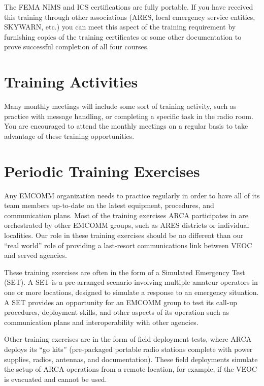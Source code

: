 \documentclass[pdflatex,letterpaper,twoside,12pt]{book}
\begin{document}
The FEMA NIMS and ICS certifications are fully portable.  If you have received this training through other associations (ARES, local emergency service entities, SKYWARN, etc.) you can meet this aspect of the training requirement by furnishing copies of the training certificates or some other documentation to prove successful completion of all four courses.


\section{Training Activities}

Many monthly meetings will include some sort of training activity, such as practice with message handling, or completing a specific task in the radio room.  You are encouraged to attend the monthly meetings on a regular basis to take advantage of these training opportunities.


\section{Periodic Training Exercises}

Any EMCOMM organization needs to practice regularly in order to have all of its team members up-to-date on the latest equipment, procedures, and communication plans.  Most of the training exercises ARCA participates in are orchestrated by other EMCOMM groups, such as ARES districts or individual localities.  Our role in these training exercises should be no different than our ``real world'' role of providing a last-resort communications link between VEOC and served agencies.

These training exercises are often in the form of a Simulated Emergency Test (SET).  A SET is a pre-arranged scenario involving multiple amateur operators in one or more locations, designed to simulate a response to an emergency situation.  A SET provides an opportunity for an EMCOMM group to test its call-up procedures, deployment skills, and other aspects of its operation such as communication plans and interoperability with other agencies.

Other training exercises are in the form of field deployment tests, where ARCA deploys its ``go kits'' (pre-packaged portable radio stations complete with power supplies, radios, antennas, and documentation).  These field deployments simulate the setup of ARCA operations from a remote location, for example, if the VEOC is evacuated and cannot be used.
\end{document}
